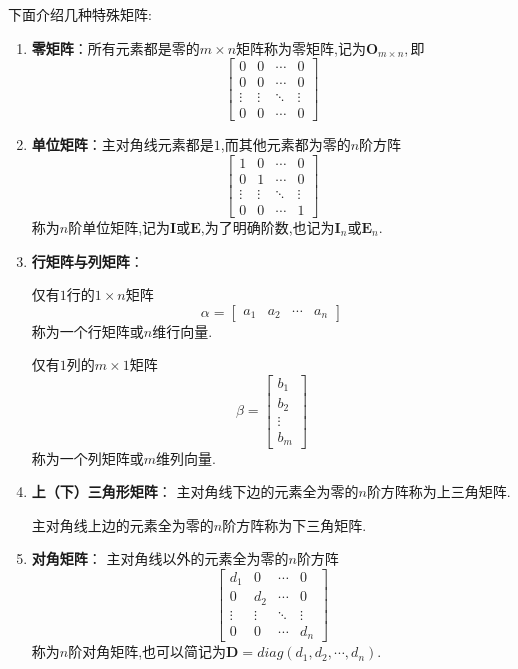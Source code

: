 下面介绍几种特殊矩阵:
\begin{enumerate}
	\item \textbf{零矩阵}：所有元素都是零的$m\times n$矩阵称为零矩阵,记为$\mathbf{O}_{m\times n},$即
	    \[
		    \begin{bmatrix}
			    0      & 0      & \cdots & 0      \\
			    0      & 0      & \cdots & 0      \\
			    \vdots & \vdots & \ddots & \vdots \\
			    0      & 0      & \cdots & 0
		    \end{bmatrix}
	    \]

	\item \textbf{单位矩阵}：主对角线元素都是$1$,而其他元素都为零的$n$阶方阵
	    \[
		    \begin{bmatrix}
			    1      & 0      & \cdots & 0      \\
			    0      & 1      & \cdots & 0      \\
			    \vdots & \vdots & \ddots & \vdots \\
			    0      & 0      & \cdots & 1
		    \end{bmatrix}
	    \]
	    称为$n$阶单位矩阵,记为$\mathbf{I}$或$\mathbf{E}$,为了明确阶数,也记为$\mathbf{I}_n$或$\mathbf{E}_n$.

	\item \textbf{行矩阵与列矩阵}：

	      仅有$1$行的$1\times n$矩阵
	      \[\alpha=
		      \begin{bmatrix}
			      a_1 & a_2 & \cdots & a_n
		      \end{bmatrix}
	      \]
	      称为一个行矩阵或$n$维行向量.

	      仅有$1$列的$m\times 1$矩阵
	      \[\beta=
		      \begin{bmatrix}
			      b_1    \\
			      b_2    \\
			      \vdots \\
			      b_m
		      \end{bmatrix}
	      \]
	      称为一个列矩阵或$m$维列向量.

	\item \textbf{上（下）三角形矩阵}：
	      主对角线下边的元素全为零的$n$阶方阵称为上三角矩阵.

	      主对角线上边的元素全为零的$n$阶方阵称为下三角矩阵.

	\item \textbf{对角矩阵}：
	      主对角线以外的元素全为零的$n$阶方阵
	      \[
		      \begin{bmatrix}
			      d_1    & 0      & \cdots & 0      \\
			      0      & d_2    & \cdots & 0      \\
			      \vdots & \vdots & \ddots & \vdots \\
			      0      & 0      & \cdots & d_n
		      \end{bmatrix}
	      \]
	      称为$n$阶对角矩阵,也可以简记为$\mathbf{D}=diag\left(d_1,d_2,\cdots,d_n\right).$

\end{enumerate}

